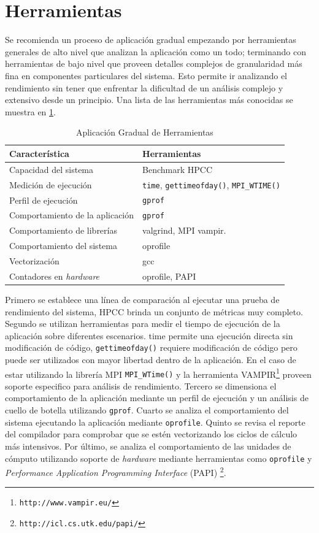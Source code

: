 \documentclass[a4paper]{report}
\begin{document}
\section{Herramientas}

Se recomienda un proceso de aplicación gradual empezando por herramientas generales de alto nivel que analizan la aplicación como un todo; terminando con herramientas de bajo nivel que proveen detalles complejos de granularidad más fina en componentes particulares del sistema. Esto permite ir analizando el rendimiento sin tener que enfrentar la dificultad de un análisis complejo y extensivo desde un principio. Una lista de las herramientas más conocidas se muestra en \ref{table:tooling}.

\begin{table}[H]
\caption{Aplicación Gradual de Herramientas}
\begin{tabular}{|l|l|} \hline
{\bf Característica} & {\bf Herramientas} \\ \hline
Capacidad del sistema & Benchmark HPCC \\ \hline
Medición de ejecución & {\tt time}, {\tt gettimeofday()}, {\tt MPI\_WTIME()} \\ \hline
Perfil de ejecución & {\tt gprof} \\ \hline
Comportamiento de la aplicación & {\tt gprof} \\ \hline
Comportamiento de librerías & valgrind, MPI vampir. \\ \hline
Comportamiento del sistema & oprofile \\ \hline
Vectorización & gcc \\ \hline
Contadores en {\it hardware} & oprofile, PAPI \\ \hline
\end{tabular}
\label{table:tooling}
\end{table}

Primero se establece una línea de comparación al ejecutar una prueba de rendimiento del sistema, HPCC brinda un conjunto de métricas muy completo. Segundo se utilizan herramientas para medir el tiempo de ejecución de la aplicación sobre diferentes escenarios. time permite una ejecución directa sin modificación de código, {\tt gettimeofday()} requiere modificación de código pero puede ser utilizados con mayor libertad dentro de la aplicación.  
En el caso de estar utilizando la librería MPI {\tt MPI\_WTime()} y la herramienta VAMPIR\footnote{\tt http://www.vampir.eu/} proveen soporte especifico para análisis de rendimiento.
Tercero se dimensiona el comportamiento de la aplicación mediante un perfil de ejecución y un análisis de cuello de botella utilizando {\tt gprof}. Cuarto se analiza el comportamiento del sistema ejecutando la aplicación mediante {\tt oprofile}. Quinto se revisa el reporte del compilador para comprobar que se estén vectorizando los ciclos de cálculo más intensivos. Por último, se analiza el comportamiento de las unidades de cómputo utilizando soporte de {\it hardware} mediante herramientas como {\tt oprofile} y {\it Performance Application Programming Interface} (PAPI) \footnote{\tt http://icl.cs.utk.edu/papi/}.
\end{document}
